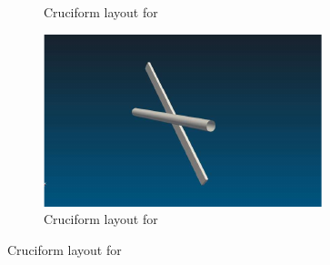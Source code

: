\documentclass[oneside]{utmthesis}
\begin{document}
\begin{figure}
\begin{subfigure}[h]{0.3\textwidth}
    \caption{Cruciform layout for \angfo{}}
    \label{fig:cruciform675}
  \end{subfigure}
  \hfill
  \begin{subfigure}[h]{0.3\textwidth}
    \includegraphics[width=\textwidth]{figs/cruciform45}
    \caption{Cruciform layout for \angth{}}
    \label{fig:cruciform45}
  \end{subfigure}


\end{figure}
\end{document}
